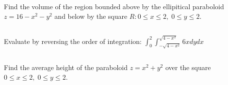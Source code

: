 \documentclass[letterpaper, 11pt]{article}
\begin{document}
\subsection{} Find the volume of the region bounded above by the ellipitical paraboloid $z = 16 - x^2 - y^2$ and below by the square $R: 0 \leq x \leq 2,\; 0 \leq y \leq 2$.

\subsection{} Evaluate by reversing the order of integration: $\int_0^2 \int_{-\sqrt{4 - x^2}}^{\sqrt{4 - x^2}} 6x dy dx$

\subsection{} Find the average height of the paraboloid $z =x^2 +y^2$ over the square $0 \leq x \leq 2,\; 0 \leq y \leq 2$.
\end{document}
